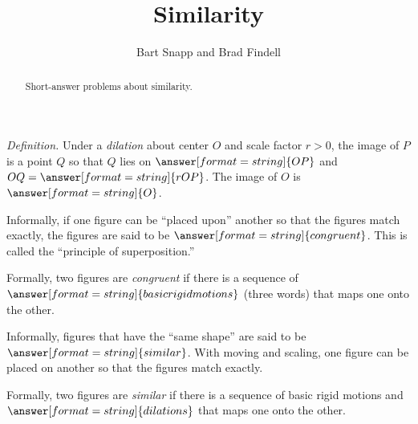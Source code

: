 \documentclass[nooutcomes]{ximera}
\title{Similarity}
\author{Bart Snapp and Brad Findell}
\begin{document}
\begin{abstract}
Short-answer problems about similarity. 
\end{abstract}
\maketitle




%
%
%
%

\begin{question}
\emph{Definition.} Under a \emph{dilation} about center $O$ and scale factor $r>0$, the image of $P$ is 
a point $Q$ so that $Q$ lies on  
$\answer[format=string]{OP}$ %
and $OQ=\answer[format=string]{rOP}$.  The image of $O$ is $\answer[format=string]{O}$. 
\end{question}


\begin{question}
Informally, if one figure can be ``placed upon'' another so that the figures match exactly, the figures are said to be $\answer[format=string]{congruent}$.  This is called the ``principle of superposition.''  
\begin{question}
Formally, two figures are \emph{congruent} if there is a sequence of $\answer[format=string]{basic rigid motions}$ (three words) that maps one onto the other.  
\end{question}
\end{question}

\begin{question}
Informally, figures that have the ``same shape'' are said to be $\answer[format=string]{similar}$.  With moving and scaling, one figure can be placed on another so that the figures match exactly.    
\begin{question}
Formally, two figures are \emph{similar} if there is a sequence of basic rigid motions and $\answer[format=string]{dilations}$ that maps one onto the other.  
\end{question}
\end{question}
\end{document}
